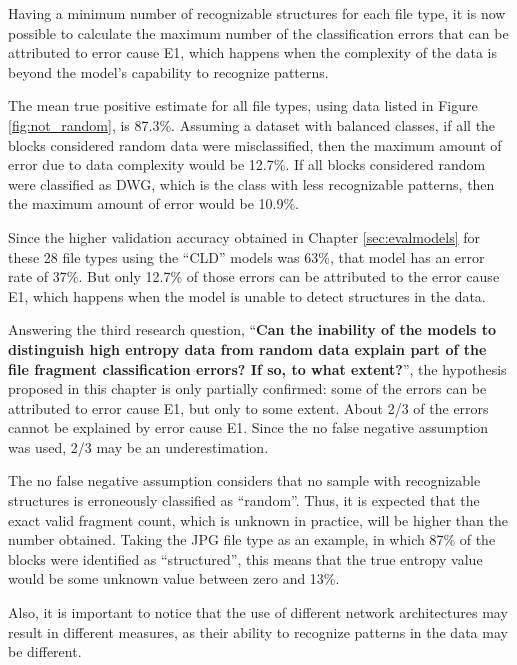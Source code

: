 Having a minimum number of recognizable structures for each file type, it is now possible to calculate the maximum number of the classification errors that can be attributed to error cause E1, which happens when the complexity of the data is beyond the model’s capability to recognize patterns.

The mean true positive estimate for all file types, using data listed in Figure \ref{fig:not_random}, is 87.3\%.  Assuming a dataset with balanced classes, if all the blocks considered random data were misclassified, then the maximum amount of error due to data complexity would be 12.7\%. If all blocks considered random were classified as DWG, which is the class with less recognizable patterns, then the maximum amount of error would be 10.9\%.

Since the higher validation accuracy obtained in Chapter \ref{sec:evalmodels} for these 28 file types using the ``CLD'' models was 63\%, that model has an error rate of 37\%. But only 12.7\% of those errors can be attributed to the error cause E1, which happens when the model is unable to detect structures in the data.

Answering the third research question, ``\textbf{Can the inability of the models to distinguish high entropy data from random data explain part of the file fragment classification errors? If so, to what extent?}'',
the hypothesis proposed in this chapter is only partially confirmed: some of the errors can be attributed to error cause E1, but only to some extent. About 2/3 of the errors cannot be explained by error cause E1. Since the no false negative assumption was used, 2/3 may be an underestimation.


The no false negative assumption considers that no sample with recognizable structures is erroneously classified as ``random''. Thus, it is expected that the exact valid fragment count, which is unknown in practice, will be higher than the number obtained. Taking the JPG file type as an example, in which 87\% of the blocks were identified as ``structured'', this means that the true entropy value would be some unknown value between zero and 13\%.

Also, it is important to notice that the use of different network architectures may result in different measures, as their ability to recognize patterns in the data may be different.
